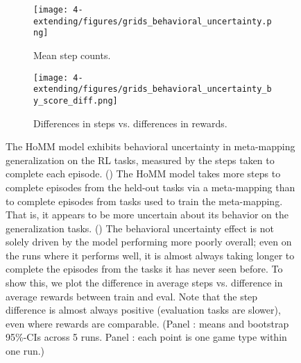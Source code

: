\begin{figure}[htb]
\centering
\begin{subfigure}{0.5\textwidth}
\centering
\texttt{[image: 4-extending/figures/grids\_behavioral\_uncertainty.png]}
\caption{Mean step counts.}\label{fig:extending:RL:behavioral_uncertainty:main}
\end{subfigure}%
\begin{subfigure}{0.5\textwidth}
\centering
\texttt{[image: 4-extending/figures/grids\_behavioral\_uncertainty\_by\_score\_diff.png]}
\caption{Differences in steps vs. differences in rewards.}\label{fig:extending:RL:behavioral_uncertainty:deltas}
\end{subfigure}
\caption[The HoMM model exhibits behavioral uncertainty in meta-mapping generalization on the RL tasks.]{The HoMM model exhibits behavioral uncertainty in meta-mapping generalization on the RL tasks, measured by the steps taken to complete each episode. () The HoMM model takes more steps to complete episodes from the held-out tasks via a meta-mapping than to complete episodes from tasks used to train the meta-mapping. That is, it appears to be more uncertain about its behavior on the generalization tasks. () The behavioral uncertainty effect is not solely driven by the model performing more poorly overall; even on the runs where it performs well, it is almost always taking longer to complete the episodes from the tasks it has never seen before. To show this, we plot the difference in average steps vs. difference in average rewards between train and eval. Note that the step difference is almost always positive (evaluation tasks are slower), even where rewards are comparable. (Panel : means and bootstrap 95\%-CIs across 5 runs. Panel : each point is one game type within one run.)} \label{fig:extending:RL:behavioral_uncertainty}
\end{figure}


